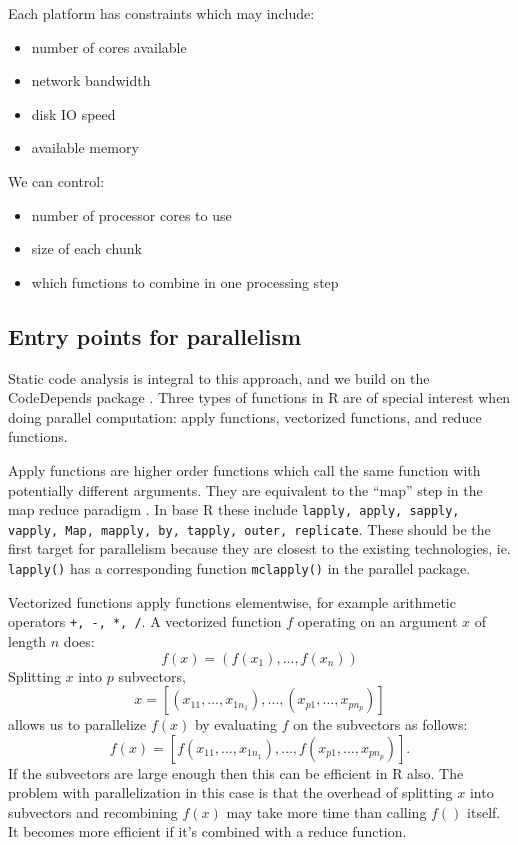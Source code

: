 \documentclass[12pt]{article}
\begin{document}
Each platform has constraints which may include:

\begin{itemize}
    \item number of cores available
    \item network bandwidth
    \item disk IO speed
    \item available memory
\end{itemize}

We can control:

\begin{itemize}
    \item number of processor cores to use
    \item size of each chunk
    \item which functions to combine in one processing step
\end{itemize}

\subsection{Entry points for parallelism}

Static code analysis is integral to this approach, and we build on the 
CodeDepends package \cite{R-CodeDepends}.
Three types of functions in R are of special interest when doing parallel
computation: apply functions, vectorized functions, and reduce functions.

Apply functions are higher order functions which call the same function
with potentially different arguments. They are equivalent to the ``map''
step in the map reduce paradigm \cite{dean2008mapreduce}.  In base R these
include \texttt{lapply, apply, sapply, vapply, Map, mapply, by, tapply,
outer, replicate}. These should be the first target for parallelism because
they are closest to the existing technologies, ie. \texttt{lapply()} has a
corresponding function \texttt{mclapply()} in the parallel package.

Vectorized functions apply functions elementwise, for example arithmetic
operators \texttt{+, -, *, /}. A vectorized function $f$
operating on an argument $x$ of length $n$ does:
\begin{equation}
\label{eq:vectorization}
    f(x) = (f(x_1), \dots, f(x_n))
\end{equation}
Splitting $x$ into $p$ subvectors, 
\[
    x = \left[ (x_{11}, \dots, x_{1 n_1}), \dots, (x_{p 1}, \dots, x_{p
n_p}) \right]
\]
allows us to parallelize $f(x)$ by evaluating $f$ on the subvectors as follows:
\[
    f(x) = \left[ f(x_{11}, \dots, x_{1 n_1}), \dots, f(x_{p 1}, \dots, x_{p
n_p}) \right].
\]
If the subvectors are large enough then this can be efficient in R also.
The problem with parallelization in this case is that the overhead of
splitting $x$ into subvectors and recombining $f(x)$ may take more time
than calling $f()$ itself.  It becomes more efficient if it's combined with
a reduce function.
\end{document}
